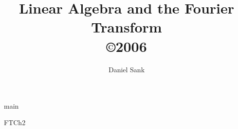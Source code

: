 \documentclass{report}
\author{Daniel Sank}
\title{Linear Algebra and the Fourier Transform \\
\copyright 2006}
\begin{document}
\maketitle

\tableofcontents

{main}

{FTCh2}
\end{document}
